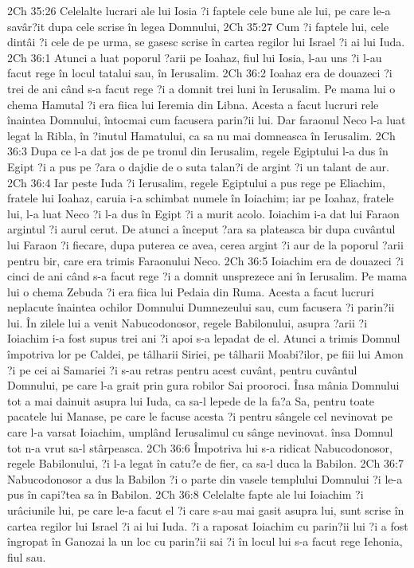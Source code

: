 2Ch 35:26  Celelalte lucrari ale lui Iosia ?i faptele cele bune ale lui, pe care le-a savâr?it dupa cele scrise în legea Domnului,
2Ch 35:27  Cum ?i faptele lui, cele dintâi ?i cele de pe urma, se gasesc scrise în cartea regilor lui Israel ?i ai lui Iuda.
2Ch 36:1  Atunci a luat poporul ?arii pe Ioahaz, fiul lui Iosia, l-au uns ?i l-au facut rege în locul tatalui sau, în Ierusalim.
2Ch 36:2  Ioahaz era de douazeci ?i trei de ani când s-a facut rege ?i a domnit trei luni în Ierusalim. Pe mama lui o chema Hamutal ?i era fiica lui Ieremia din Libna. Acesta a facut lucruri rele înaintea Domnului, întocmai cum facusera parin?ii lui. Dar faraonul Neco l-a luat legat la Ribla, în ?inutul Hamatului, ca sa nu mai domneasca în Ierusalim.
2Ch 36:3  Dupa ce l-a dat jos de pe tronul din Ierusalim, regele Egiptului l-a dus în Egipt ?i a pus pe ?ara o dajdie de o suta talan?i de argint ?i un talant de aur.
2Ch 36:4  Iar peste Iuda ?i Ierusalim, regele Egiptului a pus rege pe Eliachim, fratele lui Ioahaz, caruia i-a schimbat numele în Ioiachim; iar pe Ioahaz, fratele lui, l-a luat Neco ?i l-a dus în Egipt ?i a murit acolo. Ioiachim i-a dat lui Faraon argintul ?i aurul cerut. De atunci a început ?ara sa plateasca bir dupa cuvântul lui Faraon ?i fiecare, dupa puterea ce avea, cerea argint ?i aur de la poporul ?arii pentru bir, care era trimis Faraonului Neco.
2Ch 36:5  Ioiachim era de douazeci ?i cinci de ani când s-a facut rege ?i a domnit unsprezece ani în Ierusalim. Pe mama lui o chema Zebuda ?i era fiica lui Pedaia din Ruma. Acesta a facut lucruri neplacute înaintea ochilor Domnului Dumnezeului sau, cum facusera ?i parin?ii lui. În zilele lui a venit Nabucodonosor, regele Babilonului, asupra ?arii ?i Ioiachim i-a fost supus trei ani ?i apoi s-a lepadat de el. Atunci a trimis Domnul împotriva lor pe Caldei, pe tâlharii Siriei, pe tâlharii Moabi?ilor, pe fiii lui Amon ?i pe cei ai Samariei ?i s-au retras pentru acest cuvânt, pentru cuvântul Domnului, pe care l-a grait prin gura robilor Sai prooroci. Însa mânia Domnului tot a mai dainuit asupra lui Iuda, ca sa-l lepede de la fa?a Sa, pentru toate pacatele lui Manase, pe care le facuse acesta ?i pentru sângele cel nevinovat pe care l-a varsat Ioiachim, umplând Ierusalimul cu sânge nevinovat. însa Domnul tot n-a vrut sa-l stârpeasca.
2Ch 36:6  Împotriva lui s-a ridicat Nabucodonosor, regele Babilonului, ?i l-a legat în catu?e de fier, ca sa-l duca la Babilon.
2Ch 36:7  Nabucodonosor a dus la Babilon ?i o parte din vasele templului Domnului ?i le-a pus în capi?tea sa în Babilon.
2Ch 36:8  Celelalte fapte ale lui Ioiachim ?i urâciunile lui, pe care le-a facut el ?i care s-au mai gasit asupra lui, sunt scrise în cartea regilor lui Israel ?i ai lui Iuda. ?i a raposat Ioiachim cu parin?ii lui ?i a fost îngropat în Ganozai la un loc cu parin?ii sai ?i în locul lui s-a facut rege Iehonia, fiul sau.
